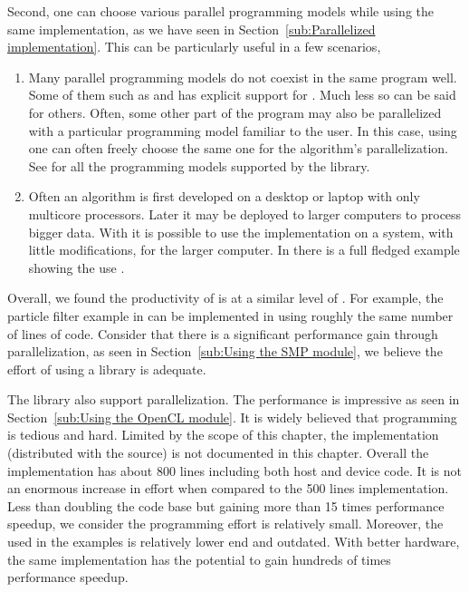 Second, one can choose various parallel programming models while using the
same implementation, as we have seen in Section~\ref{sub:Parallelized
  implementation}. This can be particularly useful in a few scenarios,
\begin{enumerate}
  \item Many parallel programming models do not coexist in the same program
    well. Some of them such as \tbb and \cilk has explicit support for
    \openmp. Much less so can be said for others. Often, some other part of
    the program may also be parallelized with a particular programming model
    familiar to the user. In this case, using \vsmc one can often freely
    choose the same one for the \smc algorithm's parallelization. See
    \cite{vsmcjss} for all the programming models supported by the library.
  \item Often an algorithm is first developed on a desktop or laptop with only
    multicore processors. Later it may be deployed to larger computers to
    process bigger data. With \vsmc it is possible to use the implementation
    on a \smp system, with little modifications, for the larger computer. In
    \cite{vsmcjss} there is a full fledged example showing the use \mpi.
\end{enumerate}

Overall, we found the productivity of \vsmc is at a similar level of \smctc.
For example, the particle filter example in \cite{smctc} can be implemented in
\vsmc using roughly the same number of lines of code. Consider that there is a
significant performance gain through parallelization, as seen in
Section~\ref{sub:Using the SMP module}, we believe the effort of using a \cpp
library is adequate.

The library also support \opencl parallelization. The performance is
impressive as seen in Section~\ref{sub:Using the OpenCL module}. It is widely
believed that \opencl programming is tedious and hard. Limited by the scope of
this chapter, the \opencl implementation (distributed with the \vsmc source)
is not documented in this chapter. Overall the \opencl implementation has
about 800 lines including both host and device code. It is not an enormous
increase in effort when compared to the 500 lines \smp implementation. Less
than doubling the code base but gaining more than 15 times performance
speedup, we consider the programming effort is relatively small. Moreover, the
\gpu used in the examples is relatively lower end and outdated. With better
hardware, the same implementation has the potential to gain hundreds of times
performance speedup.

